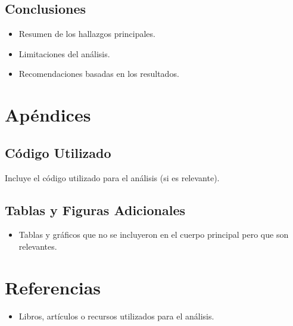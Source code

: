 \documentclass{article}
\begin{document}
\subsection{Conclusiones}
\begin{itemize}
    \item Resumen de los hallazgos principales.
    \item Limitaciones del análisis.
    \item Recomendaciones basadas en los resultados.
\end{itemize}

\section{Apéndices}
\subsection{Código Utilizado}
Incluye el código utilizado para el análisis (si es relevante).

\subsection{Tablas y Figuras Adicionales}
\begin{itemize}
    \item Tablas y gráficos que no se incluyeron en el cuerpo principal pero que son relevantes.
\end{itemize}

\section*{Referencias}
\begin{itemize}
    \item Libros, artículos o recursos utilizados para el análisis.
\end{itemize}
\end{document}
